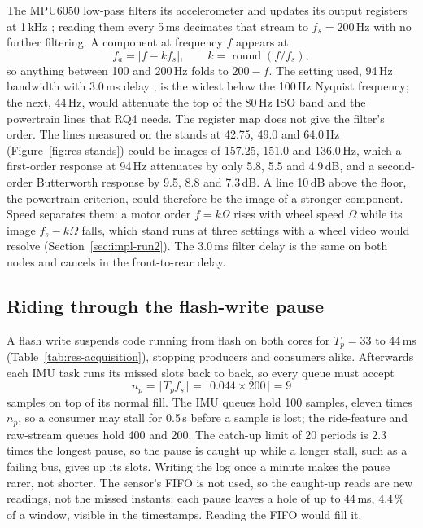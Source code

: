 The MPU6050 low-pass filters its accelerometer and updates its output registers at 1\,kHz \cite{invensense2012rm}; reading them every 5\,ms decimates that stream to $f_s = 200$\,Hz with no further filtering. A component at frequency $f$ appears at
\begin{equation}
f_a = \lvert f - k f_s \rvert, \qquad k = \operatorname{round}(f/f_s),
\label{eq:alias}
\end{equation}
so anything between 100 and 200\,Hz folds to $200 - f$. The setting used, 94\,Hz bandwidth with 3.0\,ms delay \cite{invensense2012rm}, is the widest below the 100\,Hz Nyquist frequency; the next, 44\,Hz, would attenuate the top of the 80\,Hz ISO band and the powertrain lines that RQ4 needs. The register map does not give the filter's order. The lines measured on the stands at 42.75, 49.0 and 64.0\,Hz (Figure~\ref{fig:res-stands}) could be images of 157.25, 151.0 and 136.0\,Hz, which a first-order response at 94\,Hz attenuates by only 5.8, 5.5 and 4.9\,dB, and a second-order Butterworth response by 9.5, 8.8 and 7.3\,dB. A line 10\,dB above the floor, the powertrain criterion, could therefore be the image of a stronger component. Speed separates them: a motor order $f = k\Omega$ rises with wheel speed $\Omega$ while its image $f_s - k\Omega$ falls, which stand runs at three settings with a wheel video would resolve (Section~\ref{sec:impl-run2}). The 3.0\,ms filter delay is the same on both nodes and cancels in the front-to-rear delay.

\subsection{Riding through the flash-write pause}
\label{sec:buffering}

A flash write suspends code running from flash on both cores for $T_p = 33$ to 44\,ms (Table~\ref{tab:res-acquisition}), stopping producers and consumers alike. Afterwards each IMU task runs its missed slots back to back, so every queue must accept
\begin{equation}
n_p = \lceil T_p f_s \rceil = \lceil 0.044 \times 200 \rceil = 9
\label{eq:buffer}
\end{equation}
samples on top of its normal fill. The IMU queues hold 100 samples, eleven times $n_p$, so a consumer may stall for 0.5\,s before a sample is lost; the ride-feature and raw-stream queues hold 400 and 200. The catch-up limit of 20 periods is 2.3 times the longest pause, so the pause is caught up while a longer stall, such as a failing bus, gives up its slots. Writing the log once a minute makes the pause rarer, not shorter. The sensor's FIFO is not used, so the caught-up reads are new readings, not the missed instants: each pause leaves a hole of up to 44\,ms, 4.4\,\% of a window, visible in the timestamps. Reading the FIFO would fill it.

